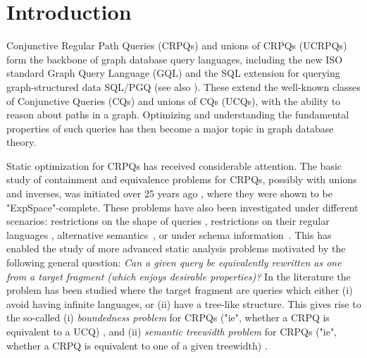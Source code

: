 \section{Introduction}
\AP\label{sec:intro}

Conjunctive Regular Path Queries (CRPQs) and unions of CRPQs (UCRPQs) form the backbone of graph database query languages, including the new ISO standard Graph Query Language (GQL) \cite{ISO2024GQL} and the SQL extension for querying graph-structured data SQL/PGQ \cite{ISO2023PGQ} (see also \cite{FrancisEtal2023GQL,FrancisEtal2023GPC}).
These extend the well-known classes of Conjunctive Queries (CQs) and unions of CQs (UCQs), with the ability to reason about paths in a graph. 
Optimizing and understanding the fundamental properties of such queries has then become a major topic in graph database theory.

Static optimization for CRPQs has received considerable attention. The basic study of containment and equivalence problems for CRPQs, possibly with unions and inverses, was initiated over 25 years ago \cite{FlorescuLevySuciu1998Containment,CalvaneseDeGiacomoLenzeriniVardi2000Containment}, where they were shown to be "ExpSpace"-complete. These problems have also been investigated under different scenarios: restrictions on the shape of queries \cite{Figueira2020Containment}, restrictions on their regular languages \cite{FigueiraEtal2020Containment}, alternative semantics~\cite{FigueiraRomero23}, or under schema information~\cite{GutierresBasultoGutowskiIbanezGarciaMurlak2022Finite,GutierresBasultoGutowskiIbanezGarciaMurlak2024Containment}.
This has enabled the study of more advanced static analysis problems motivated by the following general question: \emph{Can a given query be equivalently rewritten as one from a target fragment (which enjoys desirable properties)?}
In the literature the problem has been studied where the target fragment are queries which either (i) avoid having infinite languages, or (ii) have a tree-like structure. This gives rise to the so-called (i) \emph{boundedness problem} for CRPQs ("ie", whether a CRPQ is equivalent to a UCQ) \cite{BarceloFigueiraRomero2019Boundedness,FigueiraKrishnaSwostikMishraPadmanabha2024Boundedness}, and (ii) \emph{semantic treewidth problem} for CRPQs ("ie", whether a CRPQ is equivalent to one of a given treewidth) \cite{BarceloRomeroVardi2016SemanticAcyclicity,FigueiraMorvan2025SemanticTreeWidthLMCS,FeierGogaczMurlak24Treewidth}.
	


